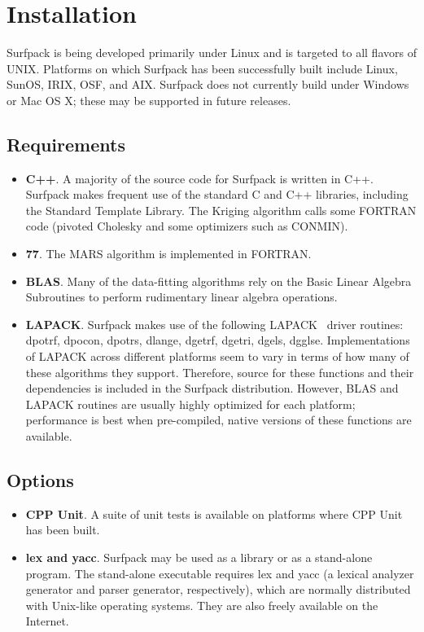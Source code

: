 \documentclass{article}
\begin{document}
\section{Installation}\label{sec:installation}
Surfpack is being developed primarily under Linux and is targeted to all flavors of UNIX.  Platforms on which Surfpack has been successfully built include Linux, SunOS, IRIX, OSF, and AIX.  Surfpack does not currently build under Windows or Mac OS X; these may be supported in future releases.
\subsection{Requirements}
\begin{itemize}
\item {\bf C++}.  A majority of the source code for Surfpack is written in C++.  Surfpack makes frequent use of the standard C and C++ libraries, including the Standard Template Library.  The Kriging algorithm calls some FORTRAN code (pivoted Cholesky and some optimizers such as CONMIN).  
\item {\bf  77}.  The MARS algorithm is implemented in FORTRAN.  
\item {\bf BLAS}.  Many of the data-fitting algorithms rely on the Basic Linear Algebra Subroutines to perform rudimentary linear algebra operations.
\item {\bf LAPACK}.  Surfpack makes use of the following LAPACK~\cite{anderson}  driver routines: dpotrf, dpocon, dpotrs, dlange, dgetrf, dgetri, dgels, dgglse.  Implementations of LAPACK across different platforms seem to vary in terms of how many of these algorithms they support.  Therefore, source for these functions and their dependencies is included in the Surfpack distribution.  However, BLAS and LAPACK routines are usually highly optimized for each platform; performance is best when pre-compiled, native versions of these functions are available.
\end{itemize}
\subsection{Options}
\begin{itemize}
\item {\bf CPP Unit}.  A suite of unit tests is available on platforms where CPP Unit has been built.
\item {\bf lex and yacc}. Surfpack may be used as a library or as a stand-alone program.  The stand-alone executable requires lex and yacc (a lexical analyzer generator and parser generator, respectively), which are normally distributed with Unix-like operating systems.  They are also freely available on the Internet.
\end{itemize}
\end{document}
